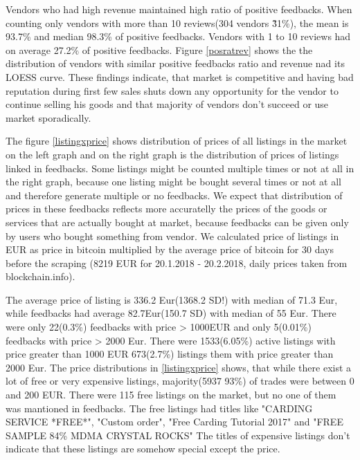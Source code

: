 \documentclass[
  digital, %
  table,   %
  lof,     %
  lot,     %
  oneside
]{fithesis3}
\begin{document}
Vendors who had high revenue maintained high ratio of positive feedbacks.
When counting only vendors with more than 10 reviews(304 vendors \~ 31\%),
the mean is 93.7\% and median 98.3\% of positive feedbacks.
Vendors with 1 to 10 reviews had on average 27.2\% of positive feedbacks.
Figure \ref{posratrev} shows the the distribution of vendors with similar
positive feedbacks ratio and revenue nad its LOESS curve.
These findings indicate, that market is competitive and
having bad reputation during first few sales shuts down any opportunity
for the vendor to continue selling his goods and that majority of vendors don't succeed or use
market sporadically.

The figure \ref{listingxprice} shows distribution of prices of all listings in
 the market on the left graph and on the right graph is the distribution of prices
 of listings linked in feedbacks. Some listings might be counted multiple times or not at all
 in the right graph, because one listing might be bought several times or not at all
 and therefore generate multiple or no feedbacks. We expect that distribution
 of prices in these feedbacks reflects more accuratelly the prices of the goods or services
 that are actually bought at market, because feedbacks can be given only by users who
 bought something from vendor. We calculated price of listings in EUR as 
 price in bitcoin multiplied by the average price of bitcoin for 30 days before the scraping
 (8219 EUR for 20.1.2018 - 20.2.2018, daily prices taken from blockchain.info).
 
 The average price of listing is 336.2 Eur(1368.2 SD!) with median of 71.3 Eur,
 while feedbacks had average 82.7Eur(150.7 SD) with median of 55 Eur.
  There were only 22(0.3\%) feedbacks with price > 1000EUR
 and only 5(0.01\%) feedbacks with price > 2000 Eur.
  There were 1533(6.05\%) active listings
 with price greater than 1000 EUR
 673(2.7\%) listings them with price greater than 2000 Eur.
 The price distributions in \ref{listingxprice} shows,
 that while there exist a lot of free or very expensive listings,
 majority(5937 93\%) of trades were between 0 and 200 EUR.
 There were 115 free listings on the market,
 but no one of them was mantioned in feedbacks.
 The free listings had titles like "CARDING SERVICE *FREE*",
 "Custom order", "Free Carding Tutorial 2017" and "FREE SAMPLE 84\% MDMA CRYSTAL ROCKS"
 The titles of expensive listings don't indicate that 
these listings are somehow special except the price.
\end{document}
